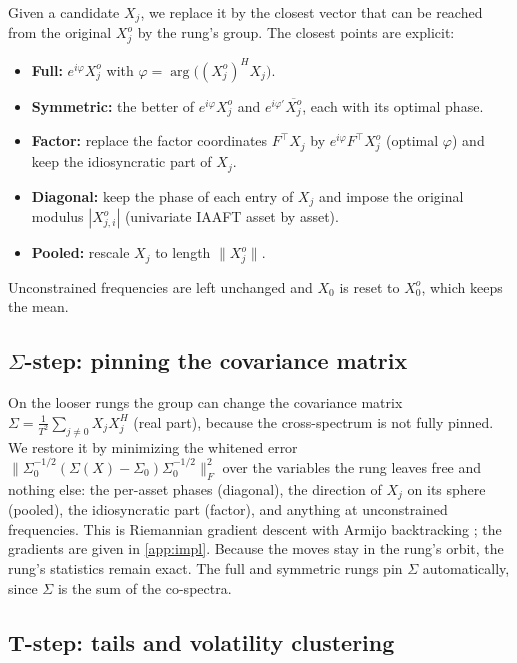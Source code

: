 \documentclass[11pt]{article}
\theoremstyle{definition}
\theoremstyle{remark}
\begin{document}
Given a candidate $X_j$, we replace it by the closest vector that can be reached from the original $X^o_j$ by the rung's group. The closest points are
explicit:
\begin{itemize}[leftmargin=*,itemsep=2pt]
\item \textbf{Full:} $e^{i\varphi}X^o_j$ with $\varphi=\arg\big((X^o_j)^HX_j\big)$.
\item \textbf{Symmetric:} the better of $e^{i\varphi}X^o_j$ and $e^{i\varphi'}\overline{X^o_j}$, each with its optimal phase.
\item \textbf{Factor:} replace the factor coordinates $F^\top X_j$ by $e^{i\varphi}F^\top X^o_j$ (optimal $\varphi$) and keep the idiosyncratic part of $X_j$.
\item \textbf{Diagonal:} keep the phase of each entry of $X_j$ and impose the original modulus $|X^o_{j,i}|$ (univariate IAAFT asset by asset).
\item \textbf{Pooled:} rescale $X_j$ to length $\|X^o_j\|$.
\end{itemize}
Unconstrained frequencies are left unchanged and $X_0$ is reset to $X^o_0$, which keeps the mean.

\subsection{$\Sigma$-step: pinning the covariance matrix}

On the looser rungs the group can change the covariance matrix $\Sigma=\frac{1}{T^2}\sum_{j\ne0} X_jX_j^H$ (real part), because the cross-spectrum is not fully
pinned. We restore it by minimizing the whitened error $\|\Sigma_0^{-1/2}(\Sigma(X)-\Sigma_0)\Sigma_0^{-1/2}\|_F^2$ over the variables the rung leaves free and
nothing else: the per-asset phases (diagonal), the direction of $X_j$ on its sphere (pooled), the idiosyncratic part (factor), and anything at unconstrained
frequencies. This is Riemannian gradient descent with Armijo backtracking \citep{absil2008}; the gradients are given in \cref{app:impl}. Because the moves stay in the
rung's orbit, the rung's statistics remain exact. The full and symmetric rungs pin $\Sigma$ automatically, since $\Sigma$ is the sum of the co-spectra.

\subsection{T-step: tails and volatility clustering}
\end{document}
